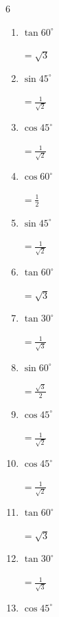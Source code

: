 \begin{multicols}{6}
\begin{enumerate}
  \item $\displaystyle \tan{60^\circ}$

        $\displaystyle =\sqrt{3}$

  \item $\displaystyle \sin{45^\circ}$

        $\displaystyle =\frac{1}{\sqrt{2}}$

  \item $\displaystyle \cos{45^\circ}$

        $\displaystyle =\frac{1}{\sqrt{2}}$

  \item $\displaystyle \cos{60^\circ}$

        $\displaystyle =\frac{1}{2}$

  \item $\displaystyle \sin{45^\circ}$

        $\displaystyle =\frac{1}{\sqrt{2}}$

  \item $\displaystyle \tan{60^\circ}$

        $\displaystyle =\sqrt{3}$

  \item $\displaystyle \tan{30^\circ}$

        $\displaystyle =\frac{1}{\sqrt{3}}$

  \item $\displaystyle \sin{60^\circ}$

        $\displaystyle =\frac{\sqrt{3}}{2}$

  \item $\displaystyle \cos{45^\circ}$

        $\displaystyle =\frac{1}{\sqrt{2}}$

  \item $\displaystyle \cos{45^\circ}$

        $\displaystyle =\frac{1}{\sqrt{2}}$

\columnbreak %

  \item $\displaystyle \tan{60^\circ}$

        $\displaystyle =\sqrt{3}$

  \item $\displaystyle \tan{30^\circ}$

        $\displaystyle =\frac{1}{\sqrt{3}}$

  \item $\displaystyle \cos{45^\circ}$


\end{enumerate}
\end{multicols}
